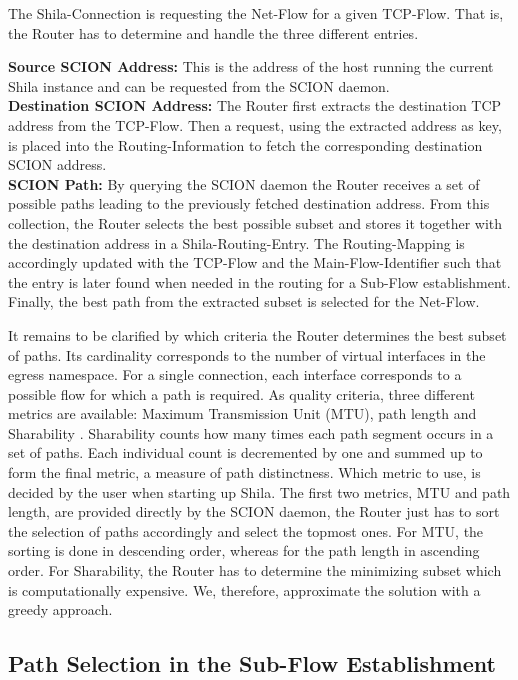 The Shila-Connection is requesting the Net-Flow for a given TCP-Flow. That is, the Router has to determine and handle the three different entries.

\textbf{Source SCION Address:} This is the address of the host running the current Shila instance and can be requested from the SCION daemon. \smallskip\\
	\textbf{Destination SCION Address:} The Router first extracts the destination TCP address from the TCP-Flow. Then a request, using the extracted address as key, is placed into the Routing-Information to fetch the corresponding destination SCION address. \smallskip\\
	\textbf{SCION Path:} By querying the SCION daemon the Router receives a set of possible paths leading to the previously fetched destination address. From this collection, the Router selects the best possible subset and stores it together with the destination address in a Shila-Routing-Entry. The Routing-Mapping is accordingly updated with the TCP-Flow and the Main-Flow-Identifier such that the entry is later found when needed in the routing for a Sub-Flow establishment. Finally, the best path from the extracted subset is selected for the Net-Flow.

It remains to be clarified by which criteria the Router determines the best subset of paths. Its cardinality corresponds to the number of virtual interfaces in the egress namespace. For a single connection, each interface corresponds to a possible flow for which a path is required. As quality criteria, three different metrics are available: Maximum Transmission Unit (MTU), path length and Sharability \cite{Sharability}. Sharability counts how many times each path segment occurs in a set of paths. Each individual count is decremented by one and summed up to form the final metric, a measure of path distinctness. Which metric to use, is decided by the user when starting up Shila. The first two metrics, MTU and path length, are provided directly by the SCION daemon, the Router just has to sort the selection of paths accordingly and select the topmost ones. For MTU, the sorting is done in descending order, whereas for the path length in ascending order. For Sharability, the Router has to determine the minimizing subset which is computationally expensive. We, therefore, approximate the solution with a greedy approach.

\subsection*{Path Selection in the Sub-Flow Establishment}

